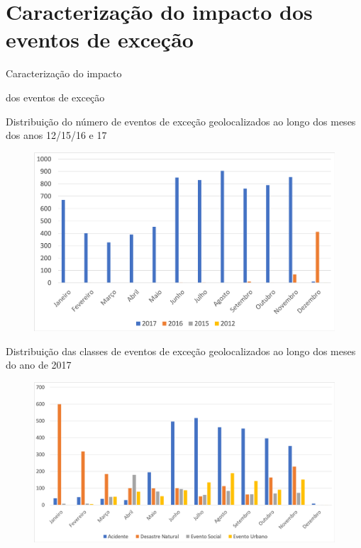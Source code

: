 \documentclass{beamer}
\begin{document}
\section{Caracterização do impacto dos eventos de exceção}
\begin{frame}
\Huge{\centerline{Caracterização do impacto}}
\Huge{\centerline{dos eventos de exceção}}
\end{frame}
\begin{frame}{Distribuição do número de eventos de exceção geolocalizados ao longo dos meses dos anos 12/15/16 e 17}
\begin{figure}[!htb]
	\centering
		\includegraphics[width=1\linewidth]{geolocated_exception_events_distribution_pt_.png}
	\label{fig:geolocated_exception_events_distribution}
\end{figure}
\end{frame}
\begin{frame}{Distribuição das classes de eventos de exceção geolocalizados ao longo dos meses do ano de 2017}
\begin{figure}[!htb]
	\centering
		\includegraphics[width=1\linewidth]{exception_events_classification_distribution_pt_.png}
	\label{fig:exception_events_classification_distribution}
\end{figure}
\end{frame}
\end{document}
